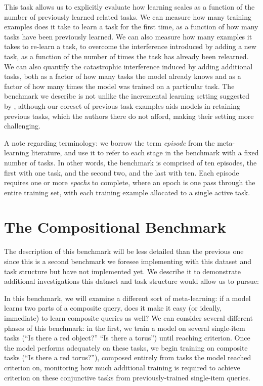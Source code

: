 This task allows us to explicitly evaluate how learning scales as a function of the number of previously learned related tasks. We can measure how many training examples does it take to learn a task for the first time, as a function of how many tasks have been previously learned. We can also measure how many examples it takes to re-learn a task, to overcome the interference introduced by adding a new task, as a function of the number of times the task has already been relearned. We can also quantify the catastrophic interference induced by adding additional tasks, both as a factor of how many tasks the model already knows and as a factor of how many times the model was trained on a particular task. The benchmark we describe is not unlike the incremental learning setting suggested by \textcite{Kemker2017a}, although our coreset of previous task examples aids models in retaining previous tasks, which the authors there do not afford, making their setting more challenging.

A note regarding terminology: we borrow the term \emph{episode} from the meta-learning literature, and use it to refer to each stage in the benchmark with a fixed number of tasks. In other words, the benchmark is comprised of ten episodes, the first with one task, and the second two, and the last with ten. Each episode requires one or more \emph{epochs} to complete, where an epoch is one pass through the entire training set, with each training example allocated to a single active task. 

\section{The Compositional Benchmark}
The description of this benchmark will be less detailed than the previous one since this is a second benchmark we foresee implementing with this dataset and task structure but have not implemented yet. We describe it to demonstrate additional investigations this dataset and task structure would allow us to pursue: 

In this benchmark, we will examine a different sort of meta-learning: if a model learns two parts of a composite query, does it make it easy (or ideally, immediate) to learn composite queries as well? We can consider several different phases of this benchmark: in the first, we train a model on several single-item tasks (“Is there a red object?” “Is there a torus”) until reaching criterion. Once the model performs adequately on these tasks, we begin training on composite tasks (“Is there a red torus?”), composed entirely from tasks the model reached criterion on, monitoring how much additional training is required to achieve criterion on these conjunctive tasks from previously-trained single-item queries. 

